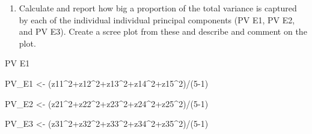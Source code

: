 \documentclass[
  letterpaper,
  DIV=11,
  numbers=noendperiod]{scrartcl}
\newenvironment{Shaded}{\begin{snugshade}}{\end{snugshade}}
\newcommand{\DecValTok}[1]{\textcolor[rgb]{0.68,0.00,0.00}{#1}}
\newcommand{\NormalTok}[1]{\textcolor[rgb]{0.00,0.23,0.31}{#1}}
\newcommand{\OtherTok}[1]{\textcolor[rgb]{0.00,0.23,0.31}{#1}}
\newcommand{\SpecialCharTok}[1]{\textcolor[rgb]{0.37,0.37,0.37}{#1}}
\providecommand{\tightlist}{%
  \setlength{\itemsep}{0pt}\setlength{\parskip}{0pt}}\usepackage{longtable,booktabs,array}
\begin{document}
\begin{enumerate}
\def\labelenumi{(\alph{enumi})}
\setcounter{enumi}{1}
\tightlist
\item
  Calculate and report how big a proportion of the total variance is
  captured by each of the individual individual principal components (PV
  E1, PV E2, and PV E3). Create a scree plot from these and describe and
  comment on the plot.
\end{enumerate}

PV E1

\begin{Shaded}
\begin{Highlighting}[]
\NormalTok{PV\_E1 }\OtherTok{\textless{}{-}}\NormalTok{ (z11}\SpecialCharTok{\^{}}\DecValTok{2}\SpecialCharTok{+}\NormalTok{z12}\SpecialCharTok{\^{}}\DecValTok{2}\SpecialCharTok{+}\NormalTok{z13}\SpecialCharTok{\^{}}\DecValTok{2}\SpecialCharTok{+}\NormalTok{z14}\SpecialCharTok{\^{}}\DecValTok{2}\SpecialCharTok{+}\NormalTok{z15}\SpecialCharTok{\^{}}\DecValTok{2}\NormalTok{)}\SpecialCharTok{/}\NormalTok{(}\DecValTok{5{-}1}\NormalTok{)}
\end{Highlighting}
\end{Shaded}

\begin{Shaded}
\begin{Highlighting}[]
\NormalTok{PV\_E2 }\OtherTok{\textless{}{-}}\NormalTok{ (z21}\SpecialCharTok{\^{}}\DecValTok{2}\SpecialCharTok{+}\NormalTok{z22}\SpecialCharTok{\^{}}\DecValTok{2}\SpecialCharTok{+}\NormalTok{z23}\SpecialCharTok{\^{}}\DecValTok{2}\SpecialCharTok{+}\NormalTok{z24}\SpecialCharTok{\^{}}\DecValTok{2}\SpecialCharTok{+}\NormalTok{z25}\SpecialCharTok{\^{}}\DecValTok{2}\NormalTok{)}\SpecialCharTok{/}\NormalTok{(}\DecValTok{5{-}1}\NormalTok{)}
\end{Highlighting}
\end{Shaded}

\begin{Shaded}
\begin{Highlighting}[]
\NormalTok{PV\_E3 }\OtherTok{\textless{}{-}}\NormalTok{ (z31}\SpecialCharTok{\^{}}\DecValTok{2}\SpecialCharTok{+}\NormalTok{z32}\SpecialCharTok{\^{}}\DecValTok{2}\SpecialCharTok{+}\NormalTok{z33}\SpecialCharTok{\^{}}\DecValTok{2}\SpecialCharTok{+}\NormalTok{z34}\SpecialCharTok{\^{}}\DecValTok{2}\SpecialCharTok{+}\NormalTok{z35}\SpecialCharTok{\^{}}\DecValTok{2}\NormalTok{)}\SpecialCharTok{/}\NormalTok{(}\DecValTok{5{-}1}\NormalTok{)}
\end{Highlighting}
\end{Shaded}
\end{document}
